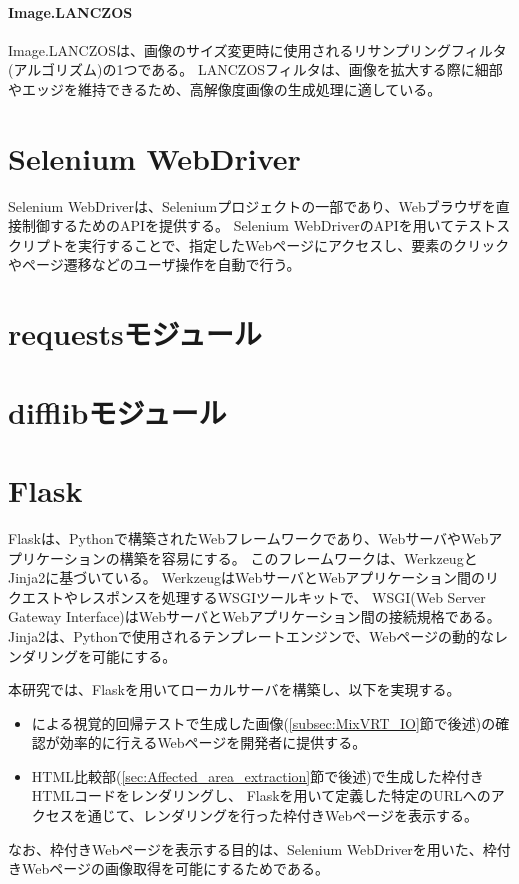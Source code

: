 \paragraph{Image.LANCZOS}
Image.LANCZOSは、画像のサイズ変更時に使用されるリサンプリングフィルタ(アルゴリズム)の1つである\cite{LANCZOS}。
LANCZOSフィルタは、画像を拡大する際に細部やエッジを維持できるため、高解像度画像の生成処理に適している。

\section{Selenium WebDriver}\label{sec:Selenium_WebDriver}
Selenium WebDriver\cite{Selenium WebDriver}は、Seleniumプロジェクト\cite{Selenium}の一部であり、Webブラウザを直接制御するためのAPIを提供する。
Selenium WebDriverのAPIを用いてテストスクリプトを実行することで、指定したWebページにアクセスし、要素のクリックやページ遷移などのユーザ操作を自動で行う。

\section{requestsモジュール}\label{sec:requests}

\section{difflibモジュール}\label{sec:difflib}

\section{Flask}\label{sec:Flask}
Flask\cite{Flask}は、Pythonで構築されたWebフレームワークであり、WebサーバやWebアプリケーションの構築を容易にする。
このフレームワークは、Werkzeug\cite{Werkzeug}とJinja2\cite{Jinja}に基づいている。
WerkzeugはWebサーバとWebアプリケーション間のリクエストやレスポンスを処理するWSGIツールキットで、
WSGI(Web Server Gateway Interface)\cite{WSGI}はWebサーバとWebアプリケーション間の接続規格である。
Jinja2は、Pythonで使用されるテンプレートエンジンで、Webページの動的なレンダリングを可能にする。
\par
本研究では、Flaskを用いてローカルサーバを構築し、以下を実現する。
\begin{itemize}
      \setlength{\itemsep}{0pt}
            \setlength{\parsep}{0pt}
      \item \toolName による視覚的回帰テストで生成した画像(\ref{subsec:MixVRT_IO}節で後述)の確認が効率的に行えるWebページを開発者に提供する。
      \item HTML比較部(\ref{sec:Affected_area_extraction}節で後述)で生成した枠付きHTMLコードをレンダリングし、
            Flaskを用いて定義した特定のURLへのアクセスを通じて、レンダリングを行った枠付きWebページを表示する。
\end{itemize}
なお、枠付きWebページを表示する目的は、Selenium WebDriverを用いた、枠付きWebページの画像取得を可能にするためである。

